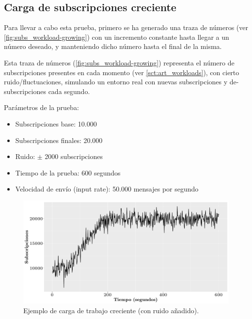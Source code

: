 
\subsection{Carga de subscripciones creciente} \label{subsct:desarrollo_pruebas-esilbops_test-inc}

Para llevar a cabo esta prueba, primero se ha generado una traza de números 
(ver \autoref{fig:subs_workload-growing}) con un incremento constante hasta 
llegar a un número deseado, y manteniendo dicho número hasta el final de la misma.

Esta traza de números (\autoref{fig:subs_workload-growing}) representa el 
número de subscripciones presentes en cada momento (ver 
\autoref{sct:art_workloads}), con cierto ruido/fluctuaciones, simulando un
entorno real con nuevas subscripciones y de-subscripciones cada segundo.

Parámetros de la prueba:
\begin{itemize}
    \item Subscripciones base: 10.000
    \item Subscripciones finales: 20.000
    \item Ruido: $\pm$ 2000 subscripciones
    \item Tiempo de la prueba: 600 segundos
    \item Velocidad de envío (input rate): 50.000 mensajes por segundo
\end{itemize}

\begin{figure}[htpb]
    \centering
    \includegraphics[width=\textwidth]{images/workload-types/subs_workload-growing.pdf}
    \caption{Ejemplo de carga de trabajo creciente (con ruido añadido).}
    \label{fig:subs_workload-growing}
\end{figure}


